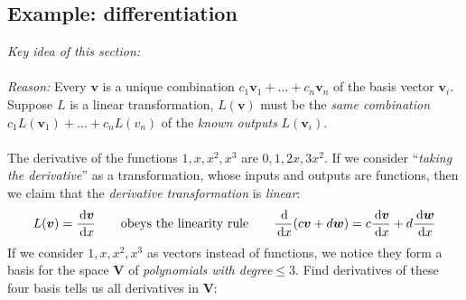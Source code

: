 \subsection{Example: differentiation}
\emph{Key idea of this section:}\\
\\
\emph{Reason:} Every $\bm v$ is a unique combination $c_1\bm v_1+\dots+c_n\bm v_n$ of the basis vector $\bm v_i$. Suppose $L$ is a linear transformation, $L(\bm v)$ must be the \emph{same combination} $c_1L(\bm v_1)+\dots+c_nL(v_n)$ of the \emph{known outputs} $L(\bm v_i)$.\\\\
The derivative of the functions $1,x,x^2,x^3$ are $0,1,2x,3x^2$. If we consider ``\emph{taking the derivative}'' as a transformation, whose inputs and outputs are functions, then we claim that the \emph{derivative transformation} is \emph{linear}:
\[
L(\bm v)=\frac{\,\mathrm{d} \bm v}{\,\mathrm{d} x}\qquad\text{obeys the linearity rule}\qquad\frac{\,\mathrm{d}}{\,\mathrm{d} x}(c\bm v+d\bm w) = c\frac{\,\mathrm{d} \bm v}{\,\mathrm{d} x}+d\frac{\,\mathrm{d} \bm w}{\,\mathrm{d} x}
\]
If we consider $1,x,x^2,x^3$ as vectors instead of functions, we notice they form a basis for the space $\bm V$ of \textit{polynomials with degree$\le 3$}. Find derivatives of these four basis tells us all derivatives in $\bm V$:

